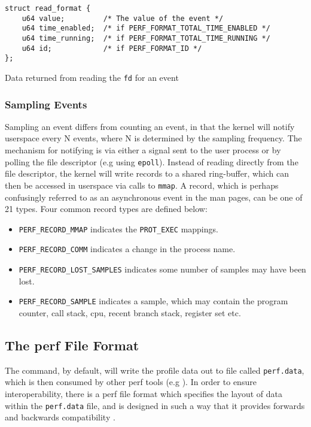 \begin{listing}\label{lst:struct_read_format}
    \begin{verbatim}
struct read_format {
    u64 value;         /* The value of the event */
    u64 time_enabled;  /* if PERF_FORMAT_TOTAL_TIME_ENABLED */
    u64 time_running;  /* if PERF_FORMAT_TOTAL_TIME_RUNNING */
    u64 id;            /* if PERF_FORMAT_ID */
};
    \end{verbatim}
    \caption{Data returned from reading the \texttt{fd} for an event}
\end{listing}

\subsubsection{Sampling Events}

Sampling an event differs from counting an event, in that the kernel will notify userspace every N events, where N is determined by the sampling frequency. The mechanism for notifying is via either a signal sent to the user process or by polling the file descriptor (e.g using \texttt{epoll}). Instead of reading directly from the file descriptor, the kernel will write records to a shared ring-buffer, which can then be accessed in userspace via calls to \texttt{mmap}. A record, which is perhaps confusingly referred to as an asynchronous event in the man pages, can be one of 21 types. Four common record types are defined below:

\ssp
\begin{itemize}
    \item \texttt{PERF\_RECORD\_MMAP} indicates the \texttt{PROT\_EXEC} mappings. 
    \item \texttt{PERF\_RECORD\_COMM} indicates a change in the process name.
    \item \texttt{PERF\_RECORD\_LOST\_SAMPLES} indicates some number of samples may have been lost.
    \item \texttt{PERF\_RECORD\_SAMPLE} indicates a sample, which may contain the program counter, call stack, cpu, recent branch stack, register set etc. 
\end{itemize}
\dsp

\subsection{The perf File Format}\label{sect:perf_file_format}

The  command, by default, will write the profile data out to file called \texttt{perf.data}, which is then consumed by other perf tools (e.g ). In order to ensure interoperability, there is a perf file format which specifies the layout of data within the \texttt{perf.data} file, and is designed in such a way that it provides forwards and backwards compatibility \cite{GithubPerfFileFormat}.

